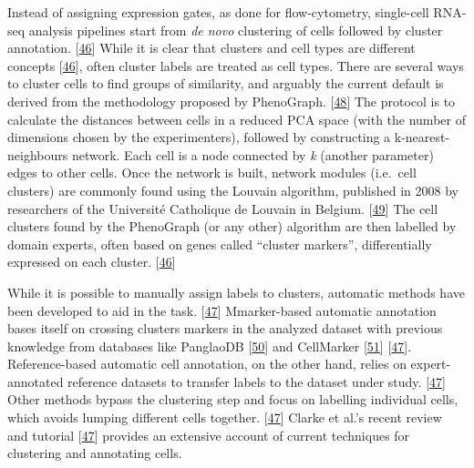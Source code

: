 Instead of assigning expression gates, as done for flow-cytometry, single-cell RNA-seq analysis pipelines start from \emph{de novo} clustering of cells followed by cluster annotation. {[}\protect\hyperlink{ref-WKbly37M}{46}{]}
While it is clear that clusters and cell types are different concepts {[}\protect\hyperlink{ref-WKbly37M}{46}{]}, often cluster labels are treated as cell types.
There are several ways to cluster cells to find groups of similarity, and arguably the current default is derived from the methodology proposed by PhenoGraph. {[}\protect\hyperlink{ref-pEJYKNFc}{48}{]}
The protocol is to calculate the distances between cells in a reduced PCA space (with the number of dimensions chosen by the experimenters), followed by constructing a k-nearest-neighbours network.
Each cell is a node connected by \emph{k} (another parameter) edges to other cells.
Once the network is built, network modules (i.e.~cell clusters) are commonly found using the Louvain algorithm, published in 2008 by researchers of the Université Catholique de Louvain in Belgium. {[}\protect\hyperlink{ref-JpCsfe9G}{49}{]}
The cell clusters found by the PhenoGraph (or any other) algorithm are then labelled by domain experts, often based on genes called ``cluster markers'', differentially expressed on each cluster. {[}\protect\hyperlink{ref-WKbly37M}{46}{]}

While it is possible to manually assign labels to clusters, automatic methods have been developed to aid in the task. {[}\protect\hyperlink{ref-ii1dVqoy}{47}{]}
Mmarker-based automatic annotation bases itself on crossing clusters markers in the analyzed dataset with previous knowledge from databases like PanglaoDB {[}\protect\hyperlink{ref-1GezH4XNn}{50}{]} and CellMarker {[}\protect\hyperlink{ref-chGii6yw}{51}{]} {[}\protect\hyperlink{ref-ii1dVqoy}{47}{]}.
Reference-based automatic cell annotation, on the other hand, relies on expert-annotated reference datasets to transfer labels to the dataset under study. {[}\protect\hyperlink{ref-ii1dVqoy}{47}{]}
Other methods bypass the clustering step and focus on labelling individual cells, which avoids lumping different cells together. {[}\protect\hyperlink{ref-ii1dVqoy}{47}{]}
Clarke et al.'s recent review and tutorial {[}\protect\hyperlink{ref-ii1dVqoy}{47}{]} provides an extensive account of current techniques for clustering and annotating cells.

